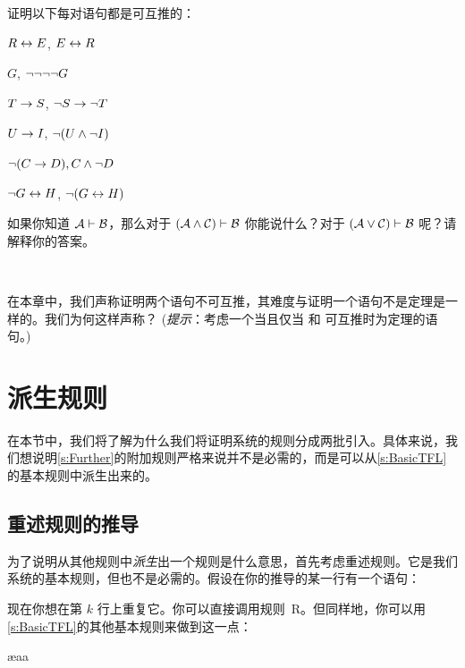 \problempart
证明以下每对语句都是可互推的：


\begin{compactlist}
\item $R \leftrightarrow E$, $E \leftrightarrow R$
\item $G$, $\neg\neg\neg\neg G$
\item $T\rightarrow S$, $\neg S \rightarrow \neg T$
\item $U \rightarrow I$, $\neg(U \wedge \neg I)$
\item $\neg (C \rightarrow D), C \wedge \neg D$
\item $\neg G \leftrightarrow H$, $\neg(G \leftrightarrow H)$
\end{compactlist}

\problempart
如果你知道 $\mathcal{A}\vdash\mathcal{B}$，那么对于 $(\mathcal{A}\wedge\mathcal{C})\vdash\mathcal{B}$ 你能说什么？对于 $(\mathcal{A}\vee\mathcal{C})\vdash\mathcal{B}$ 呢？请解释你的答案。

\

\problempart 在本章中，我们声称证明两个语句不可互推，其难度与证明一个语句不是定理是一样的。我们为何这样声称？ (\emph{提示}：考虑一个当且仅当  和  可互推时为定理的语句。)

\chapter{派生规则}\label{s:Derived}
在本节中，我们将了解为什么我们将证明系统的规则分成两批引入。具体来说，我们想说明\cref{s:Further}的附加规则严格来说并不是必需的，而是可以从\cref{s:BasicTFL}的基本规则中派生出来的。

\section{重述规则的推导}
为了说明从其他规则中\emph{派生}出一个规则是什么意思，首先考虑重述规则。它是我们系统的基本规则，但也不是必需的。假设在你的推导的某一行有一个语句：


\begin{fitchproof}
\end{fitchproof}


现在你想在第 $k$ 行上重复它。你可以直接调用规则~R。但同样地，你可以用\cref{s:BasicTFL}的其他基本规则来做到这一点：


\begin{fitchproof}
	\ae{aa}
\end{fitchproof}



